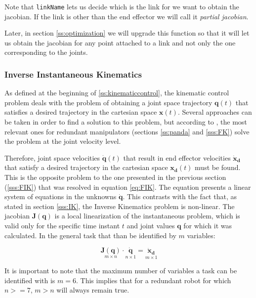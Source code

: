 Note that \lstinline{linkName} lets us decide which is the link for we want to obtain the jacobian. If the link is other than the end effector we will call it \textit{partial jacobian}.

Later, in section \ref{ss:optimization} we will upgrade this function so that it will let us obtain the jacobian for any point attached to a link and not only the one corresponding to the joints.

\subsubsection{Inverse Instantaneous Kinematics}
\label{sss:IIK}
As defined at the beginning of \ref{ss:kinematiccontrol}, the kinematic control problem deals with the problem of obtaining a joint space trajectory $\mathbf{q}(t)$ that satisfies a desired trajectory in the cartesian space $\mathbf{x}(t)$. Several approaches can be taken in order to find a solution to this problem, but according to \cite{siciliano1990kinematic}, the most relevant ones for redundant manipulators (sections \ref{ss:panda} and \ref{sss:FK}) solve the problem at the joint velocity level.

Therefore, joint space velocities $\mathbf{\dot{q}}(t)$ that result in end effector velocities $\mathbf{\dot{x}_{d}}$ that satisfy a desired trajectory in the cartesian space $\mathbf{x_{d}}(t)$ must be found. This is the opposite problem to the one presented in the previous section (\ref{sss:FIK}) that was resolved in equation \ref{eq:FIK}. The equation presents a linear system of equations in the unknowns ${\mathbf{\dot{q}}}$. This contrasts with the fact that, as stated in section \ref{sss:IK}, the Inverse Kinematics problem is non-linear. The jacobian ${\mathbf{J}(\mathbf{{q}})}$ is a local linearization of the instantaneous problem, which is valid only for the specific time instant $t$ and joint values $\mathbf{{q}}$ for which it was calculated. In the general task that than be identified by $m$ variables:

\begin{equation}
    \label{eq:linearEquations}
    \underset{m\times n}{\mathbf{J}(\mathbf{{q}})} \cdot  \underset{n\times 1}{\mathbf{\dot{q}}} = \underset{m\times 1}{\mathbf{\dot{x}_{d}}}
\end{equation}

It is important to note that the maximum number of variables a task can be identified with is $m = 6$. This implies that for a redundant robot for which $n >= 7$, $m > n$ will always remain true.

